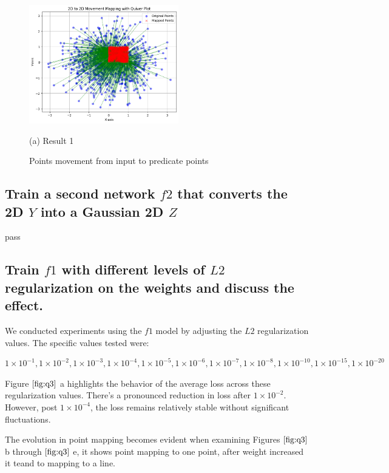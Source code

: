 \documentclass{article}
\begin{document}
\begin{figure}[htb]

  \begin{minipage}[b]{1.0\linewidth}
    \centering
    \centerline{\includegraphics[width=6.5cm]{images/f1}}
    \centerline{(a) Result 1}\medskip
  \end{minipage}
  \caption{Points movement from input to predicate points}
  \label{fig:f1}
  \end{figure}

\subsection{Train a second network $f2$ that converts the 2D $Y$ into a Gaussian 2D $Z$}
\label{ssec:q2}

pass

\subsection{Train $f1$ with different levels of $L2$ regularization on the weights and
discuss the effect.}
\label{ssec:q3}

We conducted experiments using the $f1$ model by adjusting the $L2$ regularization values. 
The specific values tested were: 

$
1\times 10^{-1}, 1\times 10^{-2}, 
1\times 10^{-3}, 1\times 10^{-4}, 1\times 10^{-5}, 
1\times 10^{-6}, 1\times 10^{-7}, 1\times 10^{-8}, 
1\times 10^{-10}, 1\times 10^{-15}, 1\times 10^{-20} 
$ 

Figure $\ref{fig:q3}$ a highlights the behavior of 
the average loss across these regularization values. 
There's a pronounced reduction in loss after 
$1\times 10^{-2}$. However, post 
$1\times 10^{-4}$, the loss remains relatively stable without significant fluctuations.

The evolution in point mapping becomes evident when examining 
Figures $\ref{fig:q3}$ b through $\ref{fig:q3}$  e, it shows point mapping to one point,
after weight increased it teand to mapping to a line.
\end{document}

